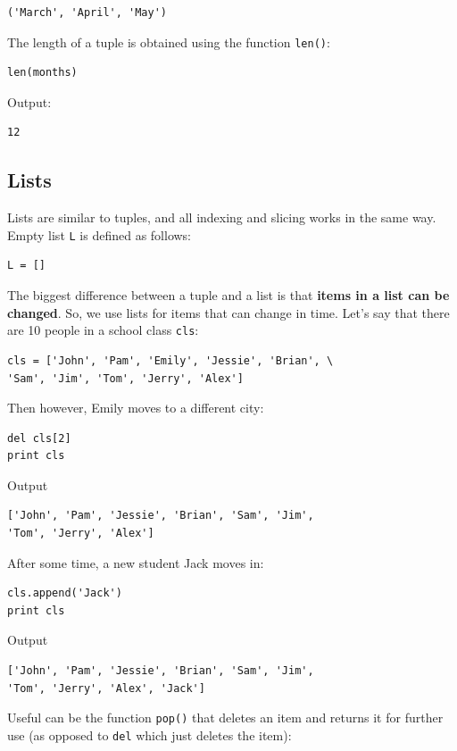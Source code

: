 \begin{verbatim}
('March', 'April', 'May')
\end{verbatim}
The length of a tuple is obtained using the function {\tt len()}:

\begin{verbatim}
len(months)
\end{verbatim}
Output:

\begin{verbatim}
12
\end{verbatim}

\subsection{Lists}

Lists are similar to tuples, and all indexing and slicing works in the same way. 
Empty list {\tt L} is defined as follows:

\begin{verbatim}
L = []
\end{verbatim}
The biggest difference between a tuple 
and a list is that {\bf items in a list can be changed}. So, we use
lists for items that can change in time. Let's say that there are 
10 people in a school class {\tt cls}:

\begin{verbatim}
cls = ['John', 'Pam', 'Emily', 'Jessie', 'Brian', \
'Sam', 'Jim', 'Tom', 'Jerry', 'Alex']
\end{verbatim}
Then however, Emily moves to a different city:

\begin{verbatim}
del cls[2]
print cls
\end{verbatim}
Output

\begin{verbatim}
['John', 'Pam', 'Jessie', 'Brian', 'Sam', 'Jim', 
'Tom', 'Jerry', 'Alex']
\end{verbatim}
After some time, a new student Jack moves in:

\begin{verbatim}
cls.append('Jack')
print cls
\end{verbatim}
Output

\begin{verbatim}
['John', 'Pam', 'Jessie', 'Brian', 'Sam', 'Jim', 
'Tom', 'Jerry', 'Alex', 'Jack']
\end{verbatim}
Useful can be the function {\tt pop()} that deletes an item and returns it for further
use (as opposed to {\tt del} which just deletes the item):

